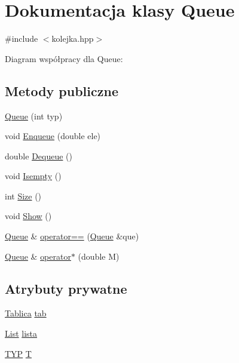 \hypertarget{class_queue}{\section{Dokumentacja klasy Queue}
\label{class_queue}
}


{\ttfamily \#include $<$kolejka.\-hpp$>$}



Diagram współpracy dla Queue\-:
\subsection*{Metody publiczne}
\begin{DoxyCompactItemize}
\item 
\hyperlink{class_queue_af1fd9bf4e7e72c4393f70d6cc6510e72}{Queue} (int typ)
\item 
void \hyperlink{class_queue_ad79218b6296d87515f0a487764c44111}{Enqueue} (double ele)
\item 
double \hyperlink{class_queue_af6a908c687baa28ac3237dcf22c1ba13}{Dequeue} ()
\item 
void \hyperlink{class_queue_ae671ac7c20b47b9a57eb008e1b946bfe}{Isempty} ()
\item 
int \hyperlink{class_queue_a2b28fe3446577261546f74b7bbe3ccc6}{Size} ()
\item 
void \hyperlink{class_queue_a2f80b1ea8c0af424d0153af7563e1c34}{Show} ()
\item 
\hyperlink{class_queue}{Queue} \& \hyperlink{class_queue_aef9c898949be023f99190e5f45996587}{operator==} (\hyperlink{class_queue}{Queue} \&que)
\item 
\hyperlink{class_queue}{Queue} \& \hyperlink{class_queue_a1b806694ad653ed3dd0fc48a216f97bc}{operator$\ast$} (double M)
\end{DoxyCompactItemize}
\subsection*{Atrybuty prywatne}
\begin{DoxyCompactItemize}
\item 
\hyperlink{class_tablica}{Tablica} \hyperlink{class_queue_a54458992e4ee244ad98f283f1c553786}{tab}
\item 
\hyperlink{class_list}{List} \hyperlink{class_queue_a4260c29a224d41878c8f9665fbf793eb}{lista}
\item 
\hyperlink{stos_8hpp_ad7b974b79929c04ea204e3304ff8c776}{T\-Y\-P} \hyperlink{class_queue_a7636f4d2ef52ee88df5db9150f4b2b1d}{T}
\end{DoxyCompactItemize}


